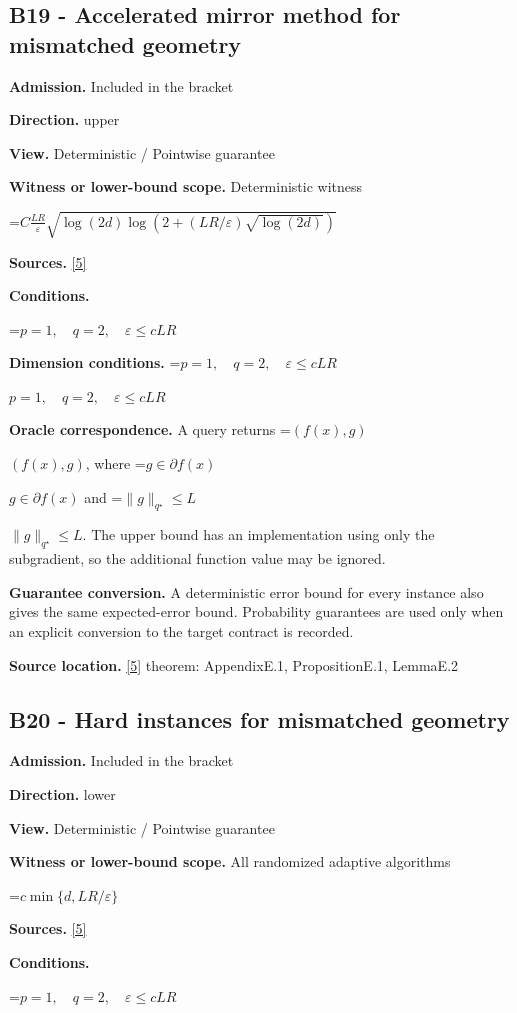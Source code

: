 \documentclass[10pt,a4paper]{article}
\newcommand{\AtlasMath}[1]{\par\begingroup\centering\setbox0=\hbox{$\displaystyle #1$}\ifdim\wd0>1.4\linewidth\typeout{ATLAS WIDE FORMULA: \the\wd0}\fi\ifdim\wd0>\linewidth\resizebox{\linewidth}{!}{\box0}\else\box0\fi\par\endgroup}
\newcommand{\AtlasInlineMath}[1]{\begingroup\setbox0=\hbox{$#1$}\ifdim\wd0>.4\linewidth\endgroup\AtlasMath{#1}\else\endgroup$#1$\fi}
\begin{document}
\subsection{B19 - Accelerated mirror method for mismatched geometry}
\textbf{Admission.} Included in the bracket

\textbf{Direction.} upper

\textbf{View.} Deterministic / Pointwise guarantee

\textbf{Witness or lower-bound scope.} Deterministic witness

\AtlasMath{C\frac{LR}{\varepsilon}\sqrt{\log(2d)\log(2+(LR/\varepsilon)\sqrt{\log(2d)})}}
\textbf{Sources.} \href{https://arxiv.org/pdf/2609.32910}{[5]}

\textbf{Conditions.} 
\AtlasMath{p=1,\quad q=2,\quad\varepsilon\le cLR}


\textbf{Dimension conditions.} \AtlasInlineMath{p=1,\quad q=2,\quad\varepsilon\le cLR}

\textbf{Oracle correspondence.} A query returns \AtlasInlineMath{(f(x),g)}, where \AtlasInlineMath{g\in\partial f(x)} and \AtlasInlineMath{\|g\|_{q^\star}\le L}. The upper bound has an implementation using only the subgradient, so the additional function value may be ignored.

\textbf{Guarantee conversion.} A deterministic error bound for every instance also gives the same expected-error bound. Probability guarantees are used only when an explicit conversion to the target contract is recorded.

\textbf{Source location.} \href{https://arxiv.org/pdf/2609.32910}{[5]} theorem: AppendixE.1, PropositionE.1, LemmaE.2

\subsection{B20 - Hard instances for mismatched geometry}
\textbf{Admission.} Included in the bracket

\textbf{Direction.} lower

\textbf{View.} Deterministic / Pointwise guarantee

\textbf{Witness or lower-bound scope.} All randomized adaptive algorithms

\AtlasMath{c\min\{d,LR/\varepsilon\}}
\textbf{Sources.} \href{https://arxiv.org/pdf/2609.32910}{[5]}

\textbf{Conditions.} 
\AtlasMath{p=1,\quad q=2,\quad\varepsilon\le cLR}
\end{document}
